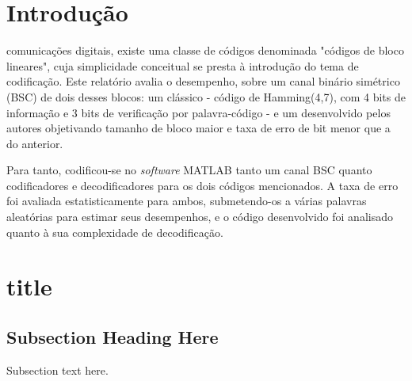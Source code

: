 \documentclass[journal,comsoc]{IEEEtran}
\begin{document}
    \section{Introdução}
     comunicações digitais, existe uma classe de códigos 
    denominada "códigos de bloco lineares", cuja simplicidade conceitual se
    presta à introdução do tema de codificação. Este relatório avalia o desempenho,
    sobre um canal binário simétrico (BSC) de dois desses blocos: um clássico - 
    código de Hamming(4,7), com 4 bits de informação e 3 bits de verificação por
    palavra-código - e um desenvolvido pelos autores objetivando tamanho de bloco
    maior e taxa de erro de bit menor que a do anterior.

    Para tanto, codificou-se no \textit{software} MATLAB tanto um canal BSC quanto
    codificadores e decodificadores para os dois códigos mencionados. A taxa de erro
    foi avaliada estatisticamente para ambos, submetendo-os a várias palavras 
    aleatórias para estimar seus desempenhos, e o código desenvolvido foi analisado
    quanto à sua complexidade de decodificação.


    
     

    \section{title}
    
    \subsection{Subsection Heading Here}
    Subsection text here.
    
\end{document}
